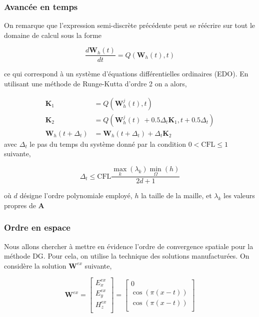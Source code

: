 \documentclass[9pt]{beamer}
\begin{document}
\begin{frame}
\frametitle{Avancée en temps}
On remarque que l'expression semi-discrète précédente peut se réécrire sur tout le domaine de calcul sous la forme

\begin{equation}
\frac{d\mathbf{W}_{h}(t)}{dt} = Q\left(\mathbf{W}_{h}(t),t\right)
\end{equation}

ce qui correspond à un système d'équations différentielles ordinaires (EDO). En utilisant une méthode de Runge-Kutta d'ordre 2 on a alors,

\begin{equation}
\begin{aligned}
\mathbf{K}_1 &= Q\left(\mathbf{W}_{h}^j(t),t\right)\\
\mathbf{K}_2 &= Q\left(\mathbf{W}_{h}^j(t)\ + 0.5\Delta_t\mathbf{K}_1 ,t + 0.5\Delta_t \right)\\
\mathbf{W}_{h}(t+\Delta_t) &= \mathbf{W}_{h}(t+\Delta_t) + \Delta_t\mathbf{K}_2
\end{aligned}
\end{equation}
avec $\Delta_t$ le pas du temps du système donné par la condition $0 < \mathrm{CFL} \leq 1$ suivante,

\begin{equation}
\Delta_t \leq \mathrm{CFL} \frac{\max\limits_k(\lambda_k) \min\limits_\Omega (h)}{2d+1}
\end{equation}

où $d$ désigne l'ordre polynomiale employé, $h$ la taille de la maille, et $\lambda_k$ les valeurs propres de $\mathbf{A}$


\end{frame}



\begin{frame}
\frametitle{Ordre en espace}
Nous allons chercher à mettre en évidence l'ordre de convergence spatiale pour la méthode DG. Pour cela, on utilise la technique des solutions manufacturées. On considère la solution $\mathbf{W}^{ex}$ suivante,

\begin{equation}
\mathbf{W}^{ex}=
\begin{bmatrix}
E_x^{ex}\\
E_y^{ex}\\
H_z^{ex}\\
\end{bmatrix}
=
\begin{bmatrix}
0\\
\cos(\pi(x-t))\\
\cos(\pi(x-t))\\
\end{bmatrix}
\end{equation}
\end{frame}
\end{document}
